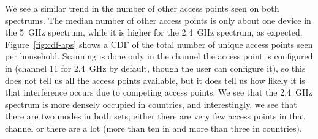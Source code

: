 We see a similar trend in the number of other access points seen on both
spectrums. The median number of other access
points is only about one device in the 5~GHz spectrum, while it is higher
for the 2.4~GHz spectrum, as expected.
Figure~\ref{fig:cdf-aps} shows a CDF
of the total number of unique access points seen per household. 
Scanning is done only in the channel the access point is configured in
(channel 11 for 2.4~GHz by default, though the user can configure it),
so this does not tell us all
the access points available, but it does tell us how likely it is
that interference occurs due to competing access points. We see that
the 2.4~GHz spectrum is more densely occupied in \developed{} countries,
and interestingly, we see
that there are two modes in both sets; either there are
very few access points in that channel or there are a lot (more than ten in \developed{}
and more than three in \developing{} countries).
%
  



